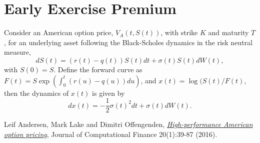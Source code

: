 \documentclass[12pt]{article}
\begin{document}
  \section{Early Exercise Premium}

    Consider an American option price, $V_A(t,S(t))$, with strike $K$ and maturity $T$, for an underlying
    asset following the Black-Scholes dynamics in the risk neutral measure,
    \begin{equation}
      dS(t) = (r(t)-q(t))S(t)dt + \sigma(t)S(t)dW(t),
    \end{equation}
    with $S(0)=S$. Define the forward curve as $F(t)=S\exp(\int_0^t(r(u)-q(u))du)$, and $x(t)=\log(S(t)/F(t)$,
    then the dynamics of $x(t)$ is given by
    \begin{equation}
      dx(t) = -\frac{1}{2}\sigma(t)^2dt + \sigma(t)dW(t).
    \end{equation}



\begin{thebibliography}{99}
    Leif Andersen, Mark Lake and Dimitri Offengenden,
    \href{https://www.risk.net/journal-of-computational-finance/2464632/high-performance-american-option-pricing}
    {\it High-performance American option pricing},
    Journal of Computational Finance 20(1):39-87 (2016).
\end{thebibliography}
\end{document}
